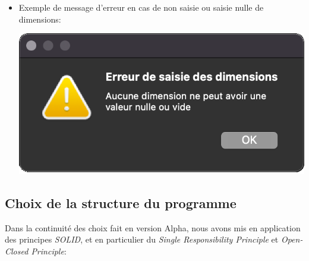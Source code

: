 \begin{itemize}
\item Exemple de message d’erreur en cas de non saisie ou saisie nulle de dimensions:

\begin{center}
    \includegraphics[scale=0.25]{images/betaErreurSaisie.png}
\end{center}


\end{itemize}

\subsection{Choix de la structure du programme}

Dans la continuité des choix fait en version Alpha, nous avons mis en application des principes \emph{SOLID}, et en particulier du
\emph{Single Responsibility Principle} et \emph{Open-Closed Principle}:

